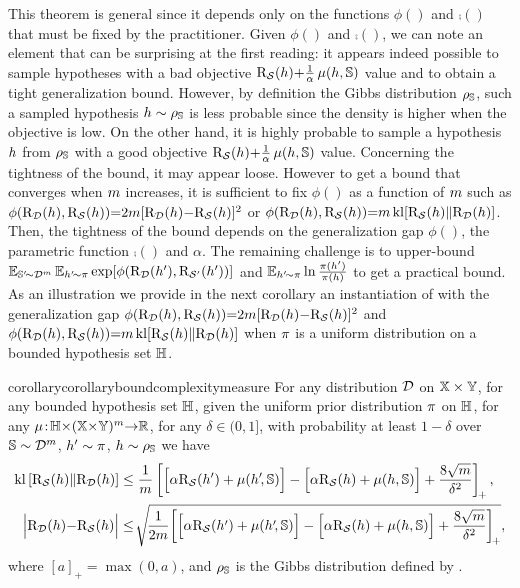 This theorem is general since it depends only on the functions $\phi()$ and $\comp()$ that must be fixed by the practitioner.
Given $\phi()$ and $\comp()$, we can note an element that can be surprising at the first reading: it appears indeed possible to sample hypotheses with a bad objective $\Risk_{\dS}(\h) {+} \frac{1}{\alpha}\comp(\h, \S)$ value and to obtain a tight generalization bound. 
However, by definition the Gibbs distribution $\AQ$, such a sampled hypothesis $\h\sim\AQ$ is less probable since the density is higher when the objective is low.
On the other hand, it is highly probable to sample a hypothesis $\h$ from $\AQ$ with a good objective $\Risk_{\dS}(\h) {+} \frac{1}{\alpha}\comp(\h, \S)$ value.
Concerning the tightness of the bound, it may appear loose.
However to get a bound that converges when $\m$ increases, it is sufficient to fix $\phi()$ as a function of $\m$ such as $\phi(\Risk_{\D}(\h), \Risk_{\dS}(\h)){=}2m[\Risk_{\D}(\h){-}\Risk_{\dS}(\h)]^2$ or $\phi(\Risk_{\D}(\h), \Risk_{\dS}(\h)){=}\m\kl[\Risk_{\dS}(\h)\|\Risk_{\D}(\h)]$.
Then, the tightness of the bound depends on the generalization gap $\phi()$, the parametric function $\comp()$ and $\alpha$.
The remaining challenge is to upper-bound  $\EE_{\S'\!{\sim}\D^\m}\EE_{\h'\!{\sim}\P}\exp[\phi(\Risk_{\D}(\h'), \Risk_{\dS'}(\h'))]$ and $\EE_{\h'\!{\sim}\P}\ln\tfrac{\P(\h')}{\P(\h)}$ to get a practical bound.
As an illustration we provide in the next corollary an instantiation of  with the generalization gap $\phi(\Risk_{\D}(\h), \Risk_{\dS}(\h)){=}2m[\Risk_{\D}(\h){-}\Risk_{\dS}(\h)]^2$ and $\phi(\Risk_{\D}(\h), \Risk_{\dS}(\h)){=}\m\kl[\Risk_{\dS}(\h)\|\Risk_{\D}(\h)]$ when $\P$ is a uniform distribution on a bounded hypothesis set $\H$.
\begin{restatable}{corollary}{corollaryboundcomplexitymeasure}\label{chap:dis-mu:corollary:disintegrated-comp}
For any distribution $\D$ on $\X\times\Y$, for any bounded hypothesis set $\H$, given the uniform prior distribution $\P$ on $\H$,  for any $\comp\!:\! \H{\times}(\X{\times}\Y)^\m{\to}\Rbb$, for any $\delta\!\in\!(0, 1]$, with probability at least $1-\delta$ over $\S\sim\D^\m$, $\h'\sim\P$, $\h\sim\AQ$ we have
\begin{align}
    \kl\LB\Risk_{\dS}(\h)\|\Risk_{\D}(\h)\RB &\le \frac{1}{\m}\LB \Big[\alpha\Risk_{\dS}(\h{'}) + \comp(\h'\!,\S)\Big] - \Big[\alpha\Risk_{\dS}(\h)+\comp(\h,\S)\Big] + \frac{8\sqrt{\m}}{\delta^2} \RB_{\!+},\label{chap:dis-mu:eq:disintegrated-comp-seeger}\\
    \Big\vert\Risk_{\D}(\h){-}\Risk_{\dS}(\h)\Big\vert &\le\! \sqrt{\!
    \frac{1}{2\m}\!\LB \Big[\alpha\Risk_{\dS}(\h{'}) + \comp(\h'\!,\S)\Big] - \Big[\alpha\Risk_{\dS}(\h)+\comp(\h,\S)\Big] + \frac{8\sqrt{\m}}{\delta^2} \RB_{\!+}},\label{chap:dis-mu:eq:disintegrated-comp-mcallester}
\end{align}
where $[a]_+ = \max(0,a)$, and $\AQ$ is the Gibbs distribution defined by .
\end{restatable}
